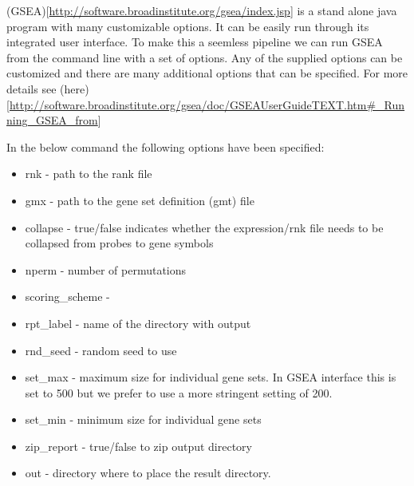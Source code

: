 \documentclass[
]{book}
\providecommand{\tightlist}{%
  \setlength{\itemsep}{0pt}\setlength{\parskip}{0pt}}
\begin{document}
(GSEA){[}\url{http://software.broadinstitute.org/gsea/index.jsp}{]} is a stand alone java program with many customizable options. It can be easily run through its integrated user interface. To make this a seemless pipeline we can run GSEA from the command line with a set of options. Any of the supplied options can be customized and there are many additional options that can be specified. For more details see (here){[}\url{http://software.broadinstitute.org/gsea/doc/GSEAUserGuideTEXT.htm\#_Running_GSEA_from}{]}

In the below command the following options have been specified:

\begin{itemize}
\tightlist
\item
  rnk - path to the rank file
\item
  gmx - path to the gene set definition (gmt) file
\item
  collapse - true/false indicates whether the expression/rnk file needs to be collapsed from probes to gene symbols
\item
  nperm - number of permutations
\item
  scoring\_scheme -
\item
  rpt\_label - name of the directory with output
\item
  rnd\_seed - random seed to use
\item
  set\_max - maximum size for individual gene sets. In GSEA interface this is set to 500 but we prefer to use a more stringent setting of 200.
\item
  set\_min - minimum size for individual gene sets
\item
  zip\_report - true/false to zip output directory
\item
  out - directory where to place the result directory.
\end{itemize}
\end{document}
